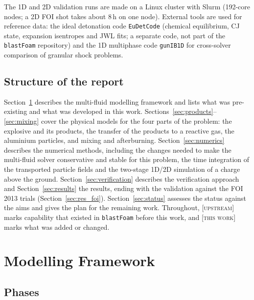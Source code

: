 \documentclass{article}
\newcommand{\up}{\textsc{[upstream]}}
\newcommand{\tw}{\textsc{[this work]}}
\begin{document}
The 1D and 2D validation runs are made on a Linux cluster with Slurm (192-core nodes; a 2D FOI shot takes about 8\,h on one node). External tools are used for reference data: the ideal detonation code \texttt{EuDetCode} (chemical equilibrium, CJ state, expansion isentropes and JWL fits; a separate code, not part of the \texttt{blastFoam} repository) and the 1D multiphase code \texttt{gunIB1D} for cross-solver comparison of granular shock problems.

\subsection{Structure of the report}

Section~\ref{sec:framework} describes the multi-fluid modelling framework and lists what was pre-existing and what was developed in this work. Sections~\ref{sec:products}--\ref{sec:mixing} cover the physical models for the four parts of the problem: the explosive and its products, the transfer of the products to a reactive gas, the aluminium particles, and mixing and afterburning. Section~\ref{sec:numerics} describes the numerical methods, including the changes needed to make the multi-fluid solver conservative and stable for this problem, the time integration of the transported particle fields and the two-stage 1D/2D simulation of a charge above the ground. Section~\ref{sec:verification} describes the verification approach and Section~\ref{sec:results} the results, ending with the validation against the FOI 2013 trials (Section~\ref{sec:res_foi}). Section~\ref{sec:status} assesses the status against the aims and gives the plan for the remaining work. Throughout, \up{} marks capability that existed in \texttt{blastFoam} before this work, and \tw{} marks what was added or changed.

\section{Modelling Framework}
\label{sec:framework}

\subsection{Phases}
\end{document}
